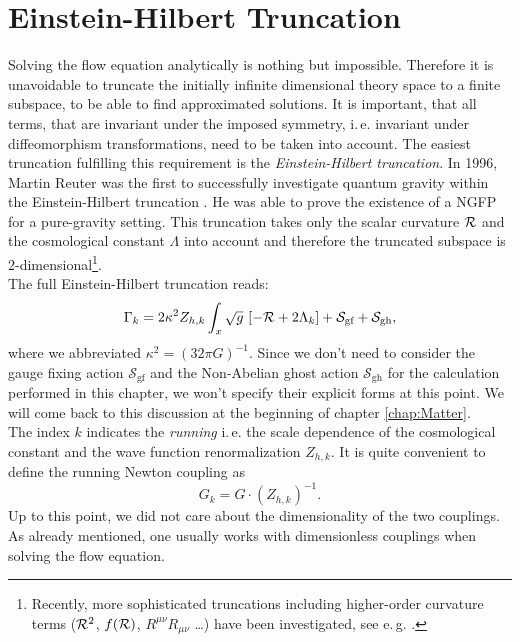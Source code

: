 \section{Einstein-Hilbert Truncation}
Solving the flow equation analytically is nothing but impossible. Therefore it is unavoidable to truncate the initially infinite dimensional theory space to a finite subspace, to be able to find approximated solutions. It is important, that all terms, that are invariant under the imposed symmetry, i.\,e. invariant under diffeomorphism transformations, need to be taken into account. The easiest truncation fulfilling this requirement is the \textit{Einstein-Hilbert truncation}. In 1996, Martin Reuter was the first to successfully investigate quantum gravity within the Einstein-Hilbert truncation \cite{Reuter1996}. He was able to prove the existence of a NGFP for a pure-gravity setting. This truncation takes only the scalar curvature $\mathcal{R}$ and the cosmological constant $\Lambda$ into account and therefore the truncated subspace is $2$-dimensional\footnote{Recently, more sophisticated truncations including higher-order curvature terms ($\mathcal{R}^2$, $f(\mathcal{R})$, $R^{\mu\nu}R_{\mu\nu}$ \dots) have been investigated, see e.\,g. \cite{AlkoferSaueressig2018}.}.\\ The full Einstein-Hilbert  truncation reads:
\begin{align}
	\Gamma_{k} = 2\kappa^2Z_{h,k} \int_x \sqrt{g} \ [-\mathcal{R} + 2\Lambda_k] + \mathcal{S}_{\text{gf}} + \mathcal{S}_{\text{gh}},
\label{eqn:EHtruncation}
\end{align}
where we abbreviated $\kappa^2 = \left(32\pi G\right)^{-1}$. Since we don't need to consider the gauge fixing action $\mathcal{S}_{\text{gf}}$ and the Non-Abelian ghost action $\mathcal{S}_{\text{gh}}$ for the calculation performed in this chapter, we won't specify their explicit forms at this point. We will come back to this discussion at the beginning of chapter \ref{chap:Matter}.\\
 The index $k$ indicates the \textit{running} i.\,e. the scale dependence of the cosmological constant and the wave function renormalization $Z_{h,k}$. It is quite convenient to define the running Newton coupling as 
 \begin{equation}
 	G_k = G \cdot \left(Z_{h,k}\right)^{-1}.
 \end{equation}
Up to this point, we did not care about the dimensionality of the two couplings. As already mentioned, one usually works with dimensionless couplings when solving the flow equation. \\
